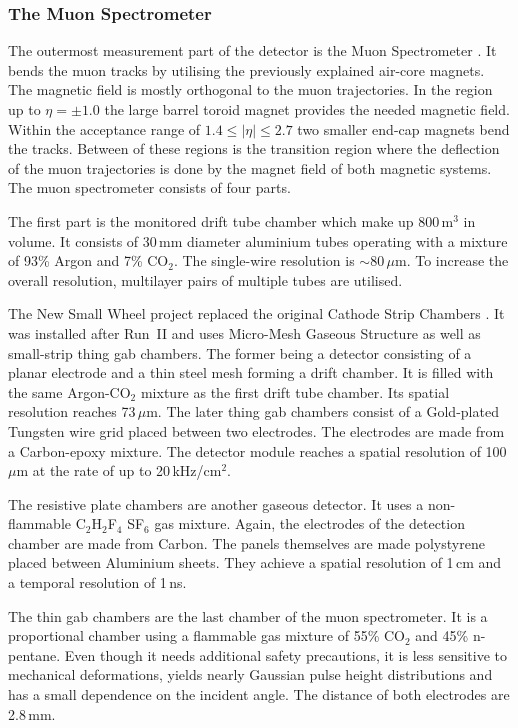\documentclass[bachelor,ngerman,english]{GAUBM}
\begin{document}
\subsubsection*{The Muon Spectrometer}
The outermost measurement part of the \atlas detector is the Muon Spectrometer \cite{atlas:tech_design_report_01,atlas:muon_chamber}. It bends the muon tracks by utilising the previously explained air-core magnets. The magnetic field is mostly orthogonal to the muon trajectories. In the region up to $\eta=\pm1.0$ the large barrel toroid magnet provides the needed magnetic field. Within the acceptance range of $1.4\leq|\eta|\leq2.7$ two smaller end-cap magnets bend the tracks. Between of these regions is the transition region where the deflection of the muon trajectories is done by the magnet field of both magnetic systems. The muon spectrometer consists of four parts.

The first part is the monitored drift tube chamber which make up 800\,m$^3$ in volume. It consists of 30\,mm diameter aluminium tubes operating with a mixture of 93\% Argon and 7\% CO$_2$. The single-wire resolution is $\sim$80\,$\mu$m. To increase the overall resolution, multilayer pairs of multiple tubes are utilised.

The New Small Wheel project replaced the original Cathode Strip Chambers \cite{atlas:muon_chamber,atlas:muon_chamber_upgrade,atlas:new_small_wheel}. It was installed after Run~II and uses Micro-Mesh Gaseous Structure as well as small-strip thing gab chambers. The former being a detector consisting of a planar electrode and a thin steel mesh forming a drift chamber. It is filled with the same Argon-CO$_2$ mixture as the first drift tube chamber. Its spatial resolution reaches 73\,$\mu$m. The later thing gab chambers consist of a Gold-plated Tungsten wire grid placed between two electrodes. The electrodes are made from a Carbon-epoxy mixture. The detector module reaches a spatial resolution of 100\,$\mu$m at the rate of up to 20\,kHz/cm$^2$.

The resistive plate chambers \cite{atlas:tech_design_report_01,atlas:muon_chamber,atlas:muon_chamber_upgrade} are another gaseous detector. It uses a non-flammable C$_2$H$_2$F$_4$ SF$_6$ gas mixture. Again, the electrodes of the detection chamber are made from Carbon. The panels themselves are made polystyrene placed between Aluminium sheets. They achieve a spatial resolution of 1\,cm and a temporal resolution of 1\,ns.

The thin gab chambers \cite{atlas:tech_design_report_01,atlas:muon_chamber} are the last chamber of the muon spectrometer. It is a proportional chamber using a flammable gas mixture of 55\% CO$_2$ and 45\% n-pentane. Even though it needs additional safety precautions, it is less sensitive to mechanical deformations, yields nearly Gaussian pulse height distributions and has a small dependence on the incident angle. The distance of both electrodes are 2.8\,mm.
\end{document}
